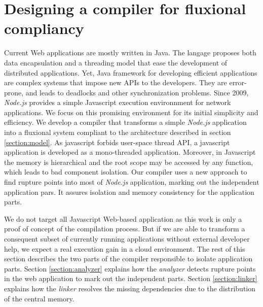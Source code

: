 \section{Designing a compiler for fluxional compliancy} \label{section:compiler}

Current Web applications are mostly written in Java. The langage proposes both data encapsulation and a threading model that ease the development of distributed applications.
Yet, Java framework for developing efficient applications are complex systems that impose new APIs\cite{Coward2003} to the developers.
They are error-prone, and leads to deadlocks and other synchronization problems.
Since 2009, \textit{Node.js}\cite{Dahl} provides a simple Javascript execution environnment for network applications.
We focus on this promising environment for its initial simplicity and efficiency.
We develop a compiler that transforms a simple \textit{Node.js} application into a fluxional system compliant to the architecture described in section \ref{section:model}.
As javascript forbids user-space thread API, a javascript application is developed as a mono-threaded application.
Moreover, in Javascript  the memory is hierarchical and the root scope may be accessed by any function, which leads to bad component isolation.
Our compiler uses a new approach to find rupture points into most of \textit{Node.js} application, marking out the independent application pars.
It assures isolation and memory consistency for the application parts.

We do not target all Javascript Web-based application as this work is only a proof of concept of the compilation process.
But if we are able to transform a consequent subset of currently running applications without external developer help, we expect a real execution gain in a cloud environment.
The rest of this section describes the two parts of the compiler responsible to isolate application parts.
Section \ref{section:analyzer} explains how the \textit{analyzer} detects rupture points in the web application to mark out the independent parts.
Section \ref{section:linker} explains how the \textit{linker} resolves the missing dependencies due to the distribution of the central memory.

